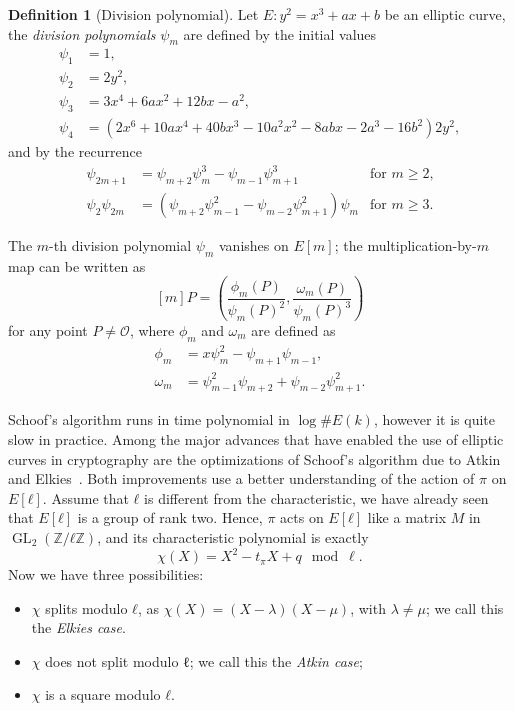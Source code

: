 \documentclass[10pt]{article}
\theoremstyle{plain}
\theoremstyle{definition}
\newtheorem{definition}[theorem]{Definition}
\DeclareMathOperator{\GL}{GL}
\def\O{\ensuremath{\mathcal{O}}}
\begin{document}
\begin{definition}[Division polynomial]
  Let $E:y^2=x^3+ax+b$ be an elliptic curve, the \emph{division
    polynomials} $ψ_m$ are defined by the initial values
  \begin{align*}
    ψ_1 &= 1,\\
    ψ_2 &= 2y^2,\\
    ψ_3 &= 3x^4 + 6ax^2 + 12bx - a^2,\\
    ψ_4 &= (2x^6 + 10ax^4 + 40bx^3 - 10a^2x^2 - 8abx - 2a^3 - 16b^2)2y^2,
  \end{align*}
  and by the recurrence
  \begin{align*}
    ψ_{2m+1}  &= ψ_{m+2}ψ_m^3 - ψ_{m-1}ψ_{m+1}^3 &\text{for $m≥2$,}\\
    ψ_2ψ_{2m} &= (ψ_{m+2}ψ_{m-1}^2 - ψ_{m-2}ψ_{m+1}^2)ψ_m &\text{for $m≥3$.}
  \end{align*}

  The $m$-th division polynomial $ψ_m$ vanishes on $E[m]$;
  the multiplication-by-$m$ map can be written as
  \[[m]P = \left(\frac{ϕ_m(P)}{ψ_m(P)^2}, \frac{ω_m(P)}{ψ_m(P)^3}\right)\]
  for any point $P≠\O$, where $ϕ_m$ and $ω_m$ are defined as
  \begin{align*}
    ϕ_m &= xψ_m^2 - ψ_{m+1}ψ_{m-1},\\
    ω_m &= ψ_{m-1}^2ψ_{m+2} + ψ_{m-2}ψ_{m+1}^2.
  \end{align*}
\end{definition}

Schoof's algorithm runs in time polynomial in $\log\#E(k)$, however it
is quite slow in practice. %
Among the major advances that have enabled the use of elliptic curves
in cryptography are the optimizations of Schoof's algorithm due to
Atkin and Elkies~\cite{atkin88,atkin91,elkies92,schoof95,elkies98}. %
Both improvements use a better understanding of the action of $π$ on
$E[ℓ]$. %
Assume that $ℓ$ is different from the characteristic, we have already
seen that $E[ℓ]$ is a group of rank two. %
Hence, $π$ acts on $E[ℓ]$ like a matrix $M$ in $\GL_2(ℤ/ℓℤ)$, and its
characteristic polynomial is exactly
\[χ(X) = X^2 - t_πX + q \mod \ell.\] %
Now we have three possibilities:
\begin{itemize}
\item $χ$ splits modulo $ℓ$, as $χ(X) = (X-λ)(X-μ)$, with $λ≠μ$; we call
  this the \emph{Elkies case}.
\item $χ$ does not split modulo ℓ; we call this the \emph{Atkin case};
\item $χ$ is a square modulo $ℓ$.
\end{itemize}
\end{document}
